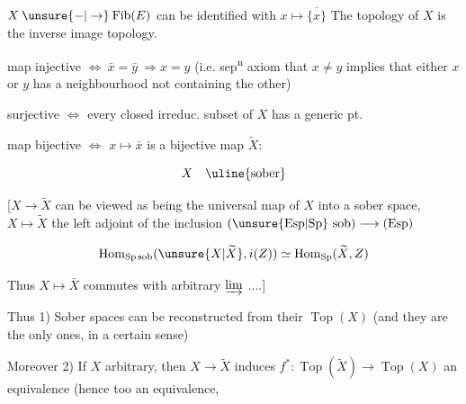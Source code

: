 
$X\mathbin{\unsure{-|\to}}\operatorname{Fib}(E)$ can be identified with $x\longmapsto\overline{\{x\}}$
The topology of $X$ is the inverse image topology.


map injective $\Longleftrightarrow\ \bar x=\bar y\ \Rightarrow x=y$ (i.e. sep\textsuperscript{n} axiom that $x\ne y$ implies
that either $x$ or $y$ has a neighbourhood not containing the other)

 surjective $\Longleftrightarrow$ every closed irreduc. subset of $X$ has a generic pt.

 map bijective $\Longleftrightarrow$ $x\mapsto\bar x$ is a bijective map  $\widetilde X$:

\[
X\quad\text{\uline{sober}}
\]

[$X\longrightarrow\widetilde X$ can be viewed as being the universal map of $X$
into a sober space, $X\longmapsto\widetilde X$ the left adjoint of
the inclusion $(\unsure{\mathrm{Esp}|\mathrm{Sp}}\ \mathrm{sob})\longrightarrow(\mathrm{Esp})$

\[
\operatorname{Hom}_{\mathrm{Sp\,sob}}(\unsure{X|\widetilde X},i(Z))\simeq\operatorname{Hom}_{\mathrm{Sp}}(\widetilde X,Z)
\]

Thus $X\mapsto\bar X$ commutes with arbitrary $\varinjlim$ ....]


Thus 1) Sober spaces can be reconstructed from their $\operatorname{Top}(X)$
(and they are the only ones, in a certain sense)

Moreover 2) If $X$ arbitrary, then $X\to\widetilde X$ induces $f^*:\operatorname{Top}(\widetilde X)\to\operatorname{Top}(X)$
an equivalence (hence too an equivalence,
